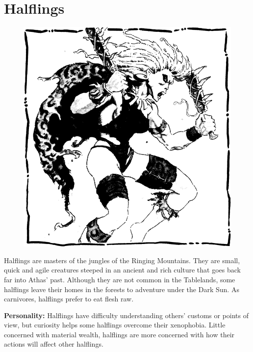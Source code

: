 \section{Halflings}

\begin{figure}[b!]
\centering
\includegraphics[width=\columnwidth]{images/halfling-1.png}
\WOTC
\end{figure}

Halflings are masters of the jungles of the Ringing Mountains. They are small, quick and agile creatures steeped in an ancient and rich culture that goes back far into Athas' past. Although they are not common in the Tablelands, some halflings leave their homes in the forests to adventure under the {\tableheader Dark Sun}. As carnivores, halflings prefer to eat flesh raw.

\textbf{Personality:} Halflings have difficulty understanding others' customs or points of view, but curiosity helps some halflings overcome their xenophobia. Little concerned with material wealth, halflings are more concerned with how their actions will affect other halflings.

